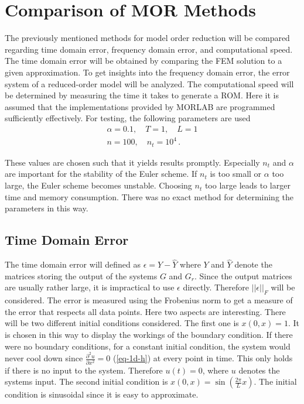 \chapter{Comparison of MOR Methods} \label{analysis}
The previously mentioned methods for model order reduction will be compared regarding time domain error, frequency domain error, and computational speed.
The time domain error will be obtained by comparing the FEM solution to a given approximation.
To get insights into the frequency domain error, the error system of a reduced-order model will be analyzed.
The computational speed will be determined by measuring the time it takes to generate a ROM.
Here it is assumed that the implementations provided by MORLAB are programmed sufficiently effectively.
For testing, the following parameters are used
\begin{gather}
\alpha = 0.1, \quad T = 1, \quad L = 1 \\
n = 100, \quad n_t = 10^{4} \,.
\end{gather}


These values are chosen such that it yields results promptly.
Especially \(n_t\) and \(\alpha\) are important for the stability of the Euler scheme.
If \(n_t\) is too small or \(\alpha\) too large, the Euler scheme becomes unstable.
Choosing \(n_t\) too large leads to larger time and memory consumption.
There was no exact method for determining the parameters in this way.

\section{Time Domain Error}
The time domain error will defined as \(\epsilon = Y - \hat{Y}\) where \(Y\) and \(\hat{Y}\) denote the matrices storing the output of the systems \(G\) and \(G_r\).
Since the output matrices are usually rather large, it is impractical to use \(\epsilon\) directly.
Therefore  \(||\epsilon||_{F}\) will be considered.
The error is measured using the Frobenius norm to get a measure of the error that respects all data points.
Here two aspects are interesting.
There will be two different initial conditions considered.
The first one is \(x(0, x) = 1\).
It is chosen in this way to display the workings of the boundary condition.
If there were no boundary conditions, for a constant initial condition, the system would never cool down since \(\frac{\partial^2 u}{\partial x^2} = 0\) (\ref{eq-1d-h}) at every point in time.
This only holds if there is no input to the system.
Therefore \(u(t) = 0\), where \(u\) denotes the systems input.
The second initial condition is \(x(0, x) = \sin(\frac{2\pi}{L}x)\).
The initial condition is sinusoidal since it is easy to approximate.

